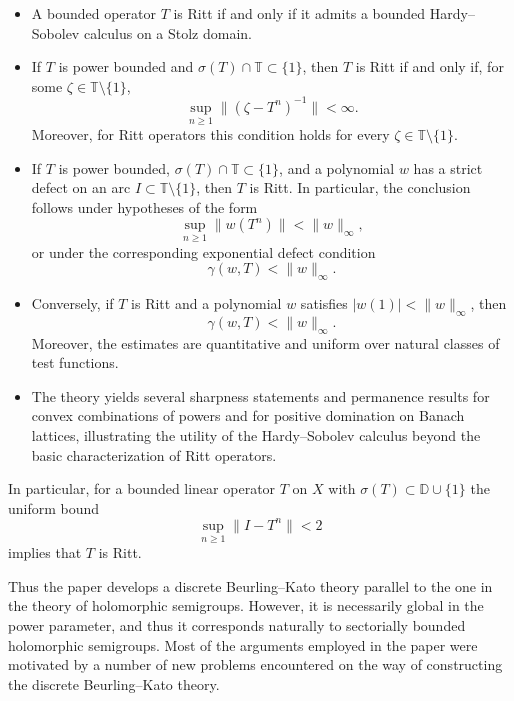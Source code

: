 \documentclass[11pt]{amsart}
\numberwithin{equation}{section}
\theoremstyle{definition}
\theoremstyle{plain}
\def\T{\mathbb{T}}
\begin{document}
\begin{itemize}[leftmargin=2.2em]
\item[(i)] A bounded operator $T$ is Ritt if and only if it admits a bounded
Hardy--Sobolev calculus on a Stolz domain.

\item[(ii)] If $T$ is power bounded and $\sigma(T)\cap\T\subset\{1\}$, then $T$ is
Ritt if and only if, for some $\zeta\in\T\setminus\{1\}$,
\[
   \sup_{n\ge1}\|(\zeta -T^n)^{-1}\|<\infty.
\]
Moreover, for Ritt operators this condition holds for every
$\zeta\in\T\setminus\{1\}$.

\item[(iii)] If $T$ is power bounded, $\sigma(T)\cap\T\subset\{1\}$, and a polynomial 
$w$ has a strict defect on an arc
$I\subset\T\setminus\{1\}$, then $T$ is Ritt. In particular, the conclusion
follows under hypotheses of the form
\[
   \sup_{n\ge1}\|w(T^n)\|<\|w\|_\infty,%
\]
or under the corresponding exponential defect condition
\[
   \gamma(w,T)<\|w\|_\infty.%
\]

\item[(iv)] Conversely, if $T$ is Ritt and a polynomial $w$ satisfies $|w(1)|<\|w\|_\infty$, then
\[
   \gamma(w,T)<\|w\|_\infty.
\]
Moreover, the estimates are quantitative and uniform over natural classes of
test functions.

\item[(v)] The theory yields several sharpness statements and
permanence results for convex combinations of powers and for positive
domination on Banach lattices, illustrating the utility of the
Hardy--Sobolev calculus beyond the basic characterization of Ritt
operators.
\end{itemize}
In particular, for a bounded linear operator $T$ on  $X$ with $\sigma(T)\subset \mathbb D \cup\{1\}$
the uniform bound
\[
\sup_{n \ge 1}\|I-T^n\|<2
\]
implies that $T$ is Ritt.

Thus the paper develops a discrete Beurling--Kato theory parallel  to the one
in the theory of holomorphic semigroups. However, it is necessarily global in the power parameter, and thus it  
corresponds naturally to sectorially bounded holomorphic semigroups. Most of the arguments employed in the paper %
were motivated by a number of new problems encountered on the way of constructing the discrete Beurling--Kato theory.
\end{document}
